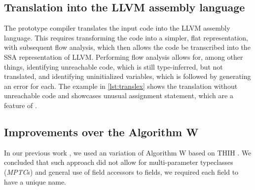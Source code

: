 \subsection{Translation into the LLVM assembly language}

The prototype compiler translates the input code into the LLVM assembly language. This requires transforming the code into a simpler, flat representation, with subsequent flow analysis, which then allows the code be transcribed into the SSA representation of LLVM. Performing flow analysis allows for, among other things, identifying unreachable code, which is still type-inferred, but not translated, and identifying uninitialized variables, which is followed by generating an error for each. The example in \cref{lst:translex} shows the translation without unreachable code and showcases unusual assignment statement, which are a feature of \cmm.

\subsection{Improvements over the Algorithm W}

In our previous work \cite{klepl2020type}, we used an variation of Algorithm W based on THIH \cite{jones1999typing}. We concluded that such approach did not allow for multi-parameter typeclasses (\emph{MPTC}s) and general use of field accessors to  fields, we required each field to have a unique name.

